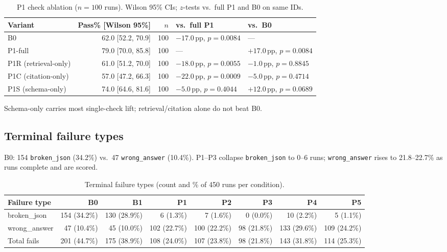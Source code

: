 \documentclass{article}
\begin{document}
\begin{table}[t]
  \caption{P1 check ablation ($n{=}100$ runs). Wilson 95\% CIs; $z$-tests vs.\ full P1 and B0 on same IDs.}
  \label{tab:p1-ablation}
  \centering
  \small
  \setlength{\tabcolsep}{2.8pt}
  \begin{tabular}{lrrll}
    \toprule
    Variant & Pass\% [Wilson 95\%] & $n$ & vs.\ full P1 & vs.\ B0 \\
    \midrule
    B0 & 62.0 [52.2, 70.9] & 100 & $-17.0$\,pp, $p{=}0.0084$ & --- \\
    P1-full & 79.0 [70.0, 85.8] & 100 & --- & $+17.0$\,pp, $p{=}0.0084$ \\
    P1R (retrieval-only) & 61.0 [51.2, 70.0] & 100 & $-18.0$\,pp, $p{=}0.0055$ & $-1.0$\,pp, $p{=}0.8845$ \\
    P1C (citation-only) & 57.0 [47.2, 66.3] & 100 & $-22.0$\,pp, $p{=}0.0009$ & $-5.0$\,pp, $p{=}0.4714$ \\
    P1S (schema-only) & 74.0 [64.6, 81.6] & 100 & $-5.0$\,pp, $p{=}0.4044$ & $+12.0$\,pp, $p{=}0.0689$ \\
    \bottomrule
  \end{tabular}
\end{table}

Schema-only carries most single-check lift; retrieval/citation alone do not beat B0.

\subsection{Terminal failure types}
\label{sec:failure-types}
B0: 154 \texttt{broken\_json} (34.2\%) vs.\ 47 \texttt{wrong\_answer} (10.4\%). P1--P3 collapse \texttt{broken\_json} to 0--6 runs; \texttt{wrong\_answer} rises to 21.8--22.7\% as runs complete and are scored.

\begin{table}[t]
  \caption{Terminal failure types (count and \% of 450 runs per condition).}
  \label{tab:failure-types}
  \centering
  \scriptsize
  \setlength{\tabcolsep}{2.8pt}
  \begin{tabular}{lrrrrrrr}
    \toprule
    Failure type & B0 & B1 & P1 & P2 & P3 & P4 & P5 \\
    \midrule
    broken\_json & 154 (34.2\%) & 130 (28.9\%) & 6 (1.3\%) & 7 (1.6\%) & 0 (0.0\%) & 10 (2.2\%) & 5 (1.1\%) \\
    wrong\_answer & 47 (10.4\%) & 45 (10.0\%) & 102 (22.7\%) & 100 (22.2\%) & 98 (21.8\%) & 133 (29.6\%) & 109 (24.2\%) \\
    \midrule
    Total fails & 201 (44.7\%) & 175 (38.9\%) & 108 (24.0\%) & 107 (23.8\%) & 98 (21.8\%) & 143 (31.8\%) & 114 (25.3\%) \\
    \bottomrule
  \end{tabular}
\end{table}
\end{document}
